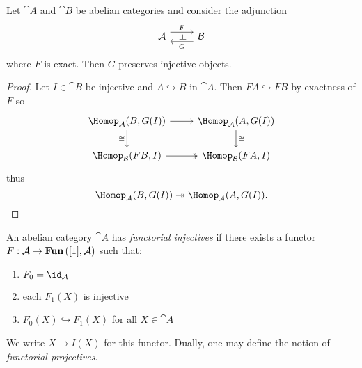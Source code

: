 \documentclass[../main.tex]{subfiles}
\begin{document}
\begin{lem}
    Let $\cat A$ and $\cat B$ be abelian categories and consider the adjunction
    \begin{equation*}
      \begin{tikzcd}
        \cat A \ar[r, "F"{name=leftadj}, shift left=2] & \cat B \ar[l, "G"{name=rightadj}, shift left=2]
        \ar[from=leftadj, to=rightadj, phantom, "\leftadj" marking]
      \end{tikzcd}
    \end{equation*}
  where $F$ is exact. Then $G$ preserves injective objects.
\end{lem}
\begin{proof}
    Let $I\in \cat B$ be injective and $A \hookrightarrow B$ in $\cat A$. Then $FA \hookrightarrow FB$ by exactness of $F$ so
\[\begin{tikzcd}
	{\Hom[\cat A](B, G(I))} & {\Hom[\cat A](A, G(I))} \\
	{\Hom[\cat B](FB, I)} & {\Hom[\cat B](FA, I)}
	\arrow[from=1-1, to=1-2]
	\arrow["\cong"', from=1-1, to=2-1]
	\arrow["\cong", from=1-2, to=2-2]
	\arrow[two heads, from=2-1, to=2-2]
\end{tikzcd}\]
thus
\[\Hom[\cat A](B, G(I)) \twoheadrightarrow \Hom[\cat A](A, G(I)). \qedhere \]   
\end{proof}

\begin{defn}
    An abelian category $\cat A$ has \emph{functorial injectives} if there exists a functor \\ $F\colon \cat A \to \catName{Fun}\left([1], \cat A\right)$ such that:
    \begin{enumerate}
        \item $F_0 = \id_{\cat A}$
        \item each $F_1(X)$ is injective
        \item $F_0(X)\hookrightarrow F_1(X)$ for all $X\in \cat A$
    \end{enumerate}
    We write $X\to I(X)$ for this functor. Dually, one may define the notion of \emph{functorial projectives}. 
\end{defn}
\end{document}
